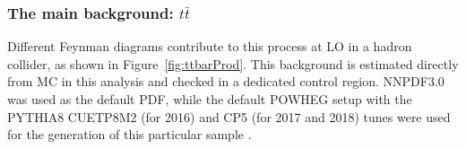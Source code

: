 \documentclass[a4paper, 10pt, openright]{report}
\begin{document}
\subsubsection{The main background: $t \bar t$} \label{subsection:ttbar}


Different Feynman diagrams contribute to this process at \ac{LO} in a hadron collider, as shown in Figure~\ref{fig:ttbarProd}. This background is estimated directly from \ac{MC} in this analysis and checked in a dedicated control region. NNPDF3.0 \cite{NNPDF} was used as the default \ac{PDF}, while the default POWHEG setup with the PYTHIA8 CUETP8M2 (for 2016) and CP5 (for 2017 and 2018) tunes were used for the generation of this particular sample \cite{PythiaTunes}.
\end{document}
